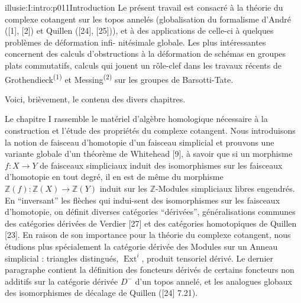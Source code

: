 \IllusieSetPhysicalPageSize{450.6bp}{704bp}
\begin{illusiefrontpage}{illusie:I:intro:p011}{Introduction}
\hypertarget{illusie:I:intro}{}\hypertarget{illusie:I:intro:p011:p1}{}%
Le présent travail est consacré à la théorie du complexe cotangent sur les topos
annelés (globalisation du formalisme d'André ([1], [2]) et Quillen ([24], [25])),
et à des applications de celle-ci à quelques problèmes de déformation infi-\linebreak
nitésimale globale. Les plus intéressantes concernent des calculs d'obstructions à
la déformation de schémas en groupes plats commutatifs, calculs qui jouent un
rôle-clef dans les travaux récents de Grothendieck\textsuperscript{(1)} et
Messing\textsuperscript{(2)} sur les groupes de Barsotti-Tate.

\vspace{4bp}
\hypertarget{illusie:I:intro:p011:p2}{}%
Voici, brièvement, le contenu des divers chapitres.

\vspace{4bp}
\hypertarget{illusie:I:intro:p011:p3}{}%
Le chapitre I rassemble le matériel d'algèbre homologique nécessaire à la
construction et l'étude des propriétés du complexe cotangent. Nous introduisons la
notion de faisceau d'homotopie d'un faisceau simplicial et prouvons une variante
globale d'un théorème de Whitehead [9], à savoir que si un morphisme
$f:X\longrightarrow Y$ de faisceaux simpliciaux induit des isomorphismes sur les
faisceaux d'homotopie en tout degré, il en est de même du morphisme
$\mathbb Z(f):\mathbb Z(X)\longrightarrow\mathbb Z(Y)$ induit sur les
$\mathbb Z$-Modules simpliciaux libres engendrés. En ``inversant'' les flèches qui
indui-\linebreak sent des isomorphismes sur les faisceaux d'homotopie, on définit
diverses catégories ``dérivées'', généralisations communes des catégories dérivées
de Verdier [27] et des catégories homotopiques de Quillen [23]. En raison de son
importance pour la théorie du complexe cotangent, nous étudions plus spécialement
la catégorie dérivée des Modules sur un Anneau simplicial : triangles distingués,
$\operatorname{Ext}^{i}$, produit tensoriel dérivé. Le dernier paragraphe contient
la définition des foncteurs dérivés de certains foncteurs non additifs sur la
catégorie dérivée $D^{-}$ d'un topos annelé, et les analogues globaux des
isomorphismes de décalage de Quillen ([24] 7.21).

\IllusieNoteRule
{}\hypertarget{illusie:I:intro:p011:n1}{}%
\hypertarget{illusie:I:intro:p011:n2}{}%
\end{illusiefrontpage}
